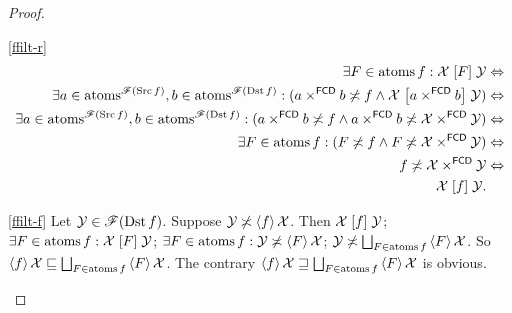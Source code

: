 \begin{proof}
~
\begin{widedisorder}
\item [{\ref{ffilt-r}}] ~
\begin{align*}
\exists F\in\operatorname{atoms} f:\mathcal{X}\mathrel{\left[F\right]}\mathcal{Y} & \Leftrightarrow\\
\exists a\in\operatorname{atoms}^{\mathscr{F}(\operatorname{Src} f)},b\in\operatorname{atoms}^{\mathscr{F}(\operatorname{Dst}
f)}:(a\times^{\mathsf{FCD}}b\not\asymp
f\land\mathcal{X}\mathrel{\left[a\times^{\mathsf{FCD}}b\right]}\mathcal{Y}) &
\Leftrightarrow\\
\exists a\in\operatorname{atoms}^{\mathscr{F}(\operatorname{Src} f)},b\in\operatorname{atoms}^{\mathscr{F}(\operatorname{Dst}
f)}:(a\times^{\mathsf{FCD}}b\not\asymp f\land
a\times^{\mathsf{FCD}}b\not\asymp\mathcal{X}\times^{\mathsf{FCD}}\mathcal{Y}) &
\Leftrightarrow\\
\exists F\in\operatorname{atoms} f:(F\not\asymp f\land
F\not\asymp\mathcal{X}\times^{\mathsf{FCD}}\mathcal{Y}) & \Leftrightarrow\\
f\not\asymp\mathcal{X}\times^{\mathsf{FCD}}\mathcal{Y} & \Leftrightarrow\\
\mathcal{X}\mathrel{\left[f\right]}\mathcal{Y}.
\end{align*}

\item [{\ref{ffilt-f}}] Let $\mathcal{Y}\in\mathscr{F}(\operatorname{Dst} f)$. Suppose
$\mathcal{Y}\not\asymp\left\langle f\right\rangle\mathcal{X}$. Then $\mathcal{X}\mathrel{\left[f\right]}\mathcal{Y}$;
$\exists F\in\operatorname{atoms} f:\mathcal{X}\mathrel{\left[F\right]}\mathcal{Y}$; $\exists F\in\operatorname{atoms}
f:\mathcal{Y}\not\asymp\left\langle F\right\rangle\mathcal{X}$;
$\mathcal{Y}\nasymp\bigsqcup_{F\in\atoms f}\supfun F\mathcal{X}$.
So $\supfun f\mathcal{X}\sqsubseteq\bigsqcup_{F\in\atoms f}\supfun
F\mathcal{X}$.
The contrary $\supfun f\mathcal{X}\sqsupseteq\bigsqcup_{F\in\atoms f}\supfun
F\mathcal{X}$
is obvious.
\end{widedisorder}
\end{proof}


